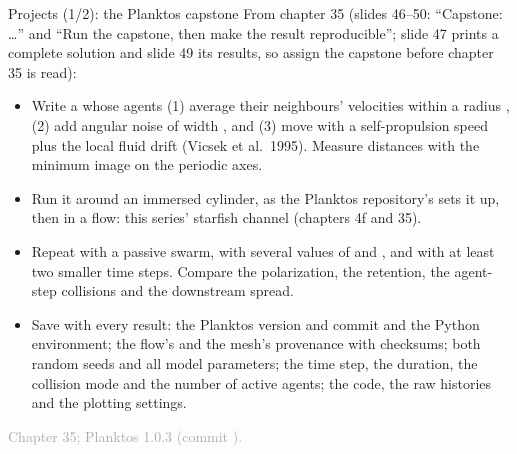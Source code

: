 \documentclass[aspectratio=169,11pt]{beamer}
\newcommand{\sourcecredit}[1]{\vfill\begin{flushright}\tiny\textcolor{DarkGray}{#1}\end{flushright}}
\begin{document}
\begin{frame}{Projects (1/2): the Planktos capstone}
\label{fr:proj1}
\footnotesize
From chapter 35 (slides 46--50: ``Capstone: \ldots'' and ``Run the capstone, then make the result reproducible''; slide 47 prints a complete solution and slide 49 its results, so assign the capstone before chapter 35 is read):
\begin{itemize}\setlength{\itemsep}{3pt}
  \item Write a  whose agents (1) average their neighbours' velocities within a radius , (2) add angular noise of width , and (3) move with a self-propulsion speed  plus the local fluid drift (Vicsek et al.\ 1995). Measure distances with the minimum image on the periodic axes.
  \item Run it around an immersed cylinder, as the Planktos repository's  sets it up, then in a flow: this series' starfish channel (chapters 4f and 35).
  \item Repeat with a passive swarm, with several values of  and , and with at least two smaller time steps. Compare the polarization, the retention, the agent-step collisions and the downstream spread.
  \item Save with every result: the Planktos version and commit and the Python environment; the flow's and the mesh's provenance with checksums; both random seeds and all model parameters; the time step, the duration, the collision mode and the number of active agents; the code, the raw histories and the plotting settings.
\end{itemize}
\sourcecredit{Chapter 35; Planktos 1.0.3 (commit ).}
\end{frame}
\end{document}
